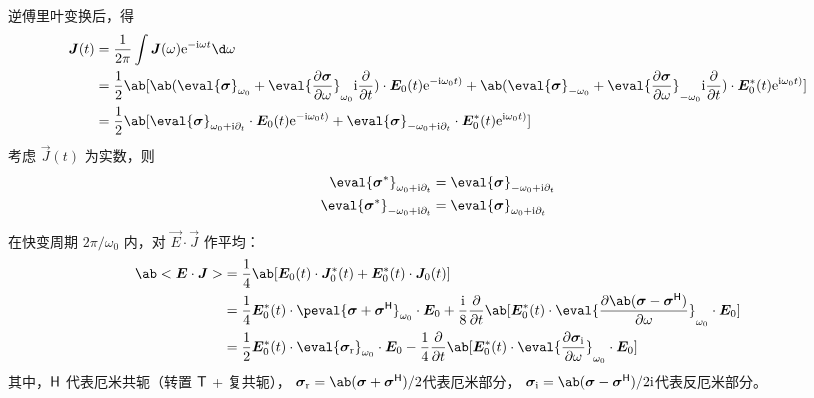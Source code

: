 逆傅里叶变换后，得
\begin{equation}\begin{aligned}
\vec{J}(t) &= \frac{1}{2\pi} \int \vec{J}(\omega) \eu^{-\im\omega t} \d\omega \\
&= \frac{1}{2} \ab[
    \ab(
        \eval{\vec{\sigma}}_{\omega_0}
        + \eval{\pdv{\vec{\sigma}}{\omega}}_{\omega_0} \im \pdv{}{t}
    ) \cdot \vec{E}_0(t) \eu^{-\im\omega_0 t)}
  + \ab(
        \eval{\vec{\sigma}}_{-\omega_0}
        + \eval{\pdv{\vec{\sigma}}{\omega}}_{-\omega_0} \im \pdv{}{t}
    ) \cdot \vec{E}_0^*(t) \eu^{\im\omega_0 t)}
] \\
&= \frac{1}{2} \ab[
    \eval{\vec{\sigma}}_{\omega_0 + \im \pdv{}!{t}}
    \cdot \vec{E}_0(t) \eu^{-\im\omega_0 t)}
  + \eval{\vec{\sigma}}_{-\omega_0 + \im \pdv{}!{t}}
    \cdot \vec{E}_0^*(t) \eu^{\im\omega_0 t)}
]
\end{aligned}\end{equation}
考虑 $\vec{J}(t)$ 为实数，则
\begin{subequations}\begin{align}
\eval{\vec{\sigma}^*}_{\omega_0 + \im \pdv{}!{t}} &
= \eval{\vec{\sigma}}_{-\omega_0 + \im \pdv{}!{t}} \\
\eval{\vec{\sigma}^*}_{-\omega_0 + \im \pdv{}!{t}} &
= \eval{\vec{\sigma}}_{\omega_0 + \im \pdv{}!{t}}
\end{align}\end{subequations}

在快变周期 $2\pi/\omega_0$ 内，对 $\vec{E}\cdot\vec{J}$ 作平均：
\begin{equation}\begin{aligned}
\ab<\vec{E}\cdot\vec{J}> &= \frac{1}{4} \ab[
    \vec{E}_0(t) \cdot \vec{J}_0^*(t)
    + \vec{E}_0^*(t) \cdot \vec{J}_0(t)
] \\
&= \frac{1}{4} \vec{E}_0^*(t) \cdot \peval{
    \vec{\sigma} + \vec{\sigma}^\HT
}_{\omega_0} \cdot \vec{E}_0
+ \frac{\im}{8} \pdv*{\ab[\vec{E}_0^*(t) \cdot \eval{
    \pdv{\ab(\vec{\sigma} - \vec{\sigma}^\HT)}{\omega}
}_{\omega_0} \cdot \vec{E}_0]}{t} \\
&= \frac{1}{2} \vec{E}_0^*(t) \cdot \eval{
    \vec{\sigma}_\re
}_{\omega_0} \cdot \vec{E}_0
- \frac{1}{4} \pdv*{\ab[\vec{E}_0^*(t) \cdot \eval{
    \pdv{\vec{\sigma}_\im}{\omega}
}_{\omega_0} \cdot \vec{E}_0]}{t}
\end{aligned}\end{equation}
其中，$\mathsf{H}$ 代表厄米共轭（转置 $\mathsf{T}$ + 复共轭），
$\vec{\sigma}_\re=\ab(\vec{\sigma}+\vec{\sigma}^\HT)/2$代表厄米部分，
$\vec{\sigma}_\im=\ab(\vec{\sigma}-\vec{\sigma}^\HT)/2\im$代表反厄米部分。

